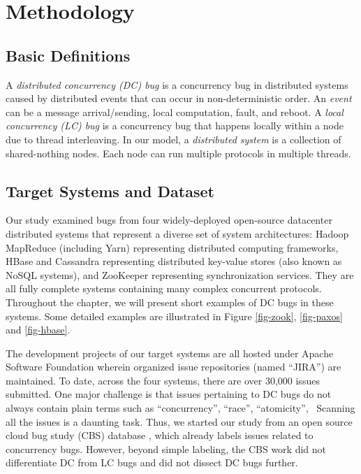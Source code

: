 

\section{Methodology}
\label{sec-met}



\vfifteen
\subsection{Basic Definitions}
\label{met-def}

A {\em distributed concurrency (DC) bug} is a 
concurrency bug in distributed
systems caused by distributed events that can occur in
non-deterministic order.  An {\em event} can be a message arrival/sending, 
local computation, fault, and reboot.
%
A {\em local concurrency (LC) bug} is a 
concurrency bug that happens locally
within a node due to thread interleaving.
%
In our model, a {\em distributed system} is a collection of
shared-nothing nodes.  Each node can run multiple protocols in
multiple threads.
%


\subsection{Target Systems and Dataset}
\label{met-data}


Our study examined bugs from four widely-deployed
open-source datacenter distributed
systems that represent a diverse set of system architectures: Hadoop
MapReduce (including Yarn) \cite{HadoopWeb} representing distributed
computing frameworks, HBase \cite{HBaseWeb} and Cassandra
\cite{CassandraWeb} representing distributed key-value stores (also
known as NoSQL systems), and ZooKeeper \cite{ZooKeeperWeb}
representing synchronization services.
%
They are all fully complete systems containing many complex concurrent
protocols.  Throughout the chapter, we will present short examples of DC
bugs in these systems.  Some detailed examples are illustrated in Figure
\ref{fig-zook}, \ref{fig-paxos} and \ref{fig-hbase}.

The development projects of our target systems are all hosted under
Apache Software Foundation wherein organized issue repositories (named
``JIRA'') are maintained.  To date, across the four systems, there are
over 30,000 issues submitted.  One major challenge is that issues
pertaining to DC bugs do not always contain plain terms such as
``concurrency'', ``race'', ``atomicity'', \etc\ Scanning all the
issues is a daunting task.  Thus, we started our study from an open
source cloud bug study (CBS) database \cite{CBSWeb}, which already
labels issues related to concurrency bugs.  However, beyond simple
labeling, the CBS work did not differentiate DC from LC bugs and did
not dissect DC bugs further.

